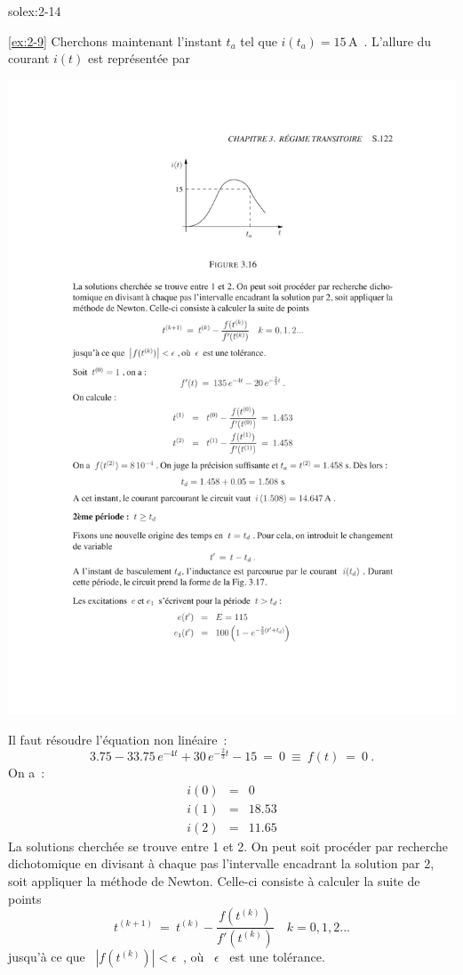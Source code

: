 \begin{exwithsol}{solex:2-14}
\begin{solexercise}{\ref{ex:2-9}}
Cherchons maintenant l'instant $t_a$ tel que $i(t_a) =
15\,$A~. L'allure du courant $i(t)$ est repr\'esent\'ee par
\begin{center}
	\includegraphics[width=\linewidth]{sol_exercices/ex3-9-2}
\end{center}
Il faut r\'esoudre l'\'equation non lin\'eaire~:
\[ 3.75 - 33.75 \, e^{-4t} + 30 \, e^{-\frac{2}{3}t} - 15 \: = \: 0 \: \equiv \ f(t) \: = \: 0~. \]
On a~:
\begin{eqnarray*}
	i(0) &=&0\\
	i(1) &=& 18.53\\
	i(2) &=& 11.65
\end{eqnarray*}
La solutions cherch\'ee se trouve entre 1 et 2.  On peut soit proc\'eder
par recherche dichotomique en divisant \`a chaque pas l'intervalle
encadrant la solution par 2, soit appliquer la m\'ethode de
Newton. Celle-ci consiste \`a calculer la suite de points
\[ t^{(k+1)} \: = \: t^{(k)} - \frac{f(t^{(k)})}{f'(t^{(k)})} \quad k = 0,1,2... \]
jusqu'\`a ce que \ $\left| f(t^{(k)})\right| < \epsilon$~, o\`u \ $\epsilon$ \ est une tol\'erance.


\end{solexercise}
\end{exwithsol}
